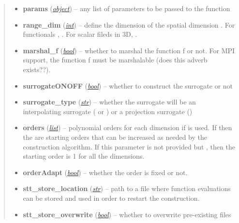 \documentclass[a4paper,10pt,english]{sphinxmanual}
\begin{document}
\begin{fulllineitems}
\begin{quote}
\begin{description}
\begin{itemize}
\item {} 
\textbf{params} (\href{http://docs.python.org/library/functions.html\#object}{\emph{object}}) -- any list of parameters to be passed to the function 

\item {} 
\textbf{range\_dim} (\href{http://docs.python.org/library/functions.html\#int}{\emph{int}}) -- define the dimension of the spatial dimension . For functionals , . For scalar fileds in 3D, .

\item {} 
\textbf{marshal\_f} (\href{http://docs.python.org/library/functions.html\#bool}{\emph{bool}}) -- whether to marshal the function f or not. For MPI support, the function f must be marshalable (does this adverb exists??).

\item {} 
\textbf{surrogateONOFF} (\href{http://docs.python.org/library/functions.html\#bool}{\emph{bool}}) -- whether to construct the surrogate or not

\item {} 
\textbf{surrogate\_type} (\href{http://docs.python.org/library/functions.html\#str}{\emph{str}}) -- whether the surrogate will be an interpolating surrogate ( or ) or a projection surrogate ()

\item {} 
\textbf{orders} (\href{http://docs.python.org/library/functions.html\#list}{\emph{list}}) -- polynomial orders for each dimension if  is used. If  then the  are starting orders that can be increased as needed by the construction algorithm. If this parameter is not provided but , then the starting order is 1 for all the dimensions.

\item {} 
\textbf{orderAdapt} (\href{http://docs.python.org/library/functions.html\#bool}{\emph{bool}}) -- whether the order is fixed or not.

\item {} 
\textbf{stt\_store\_location} (\href{http://docs.python.org/library/functions.html\#str}{\emph{str}}) -- path to a file where function evaluations can be stored and used in order to restart the construction.

\item {} 
\textbf{stt\_store\_overwrite} (\href{http://docs.python.org/library/functions.html\#bool}{\emph{bool}}) -- whether to overwrite pre-existing files


\end{itemize}
\end{description}
\end{quote}
\end{fulllineitems}
\end{document}
